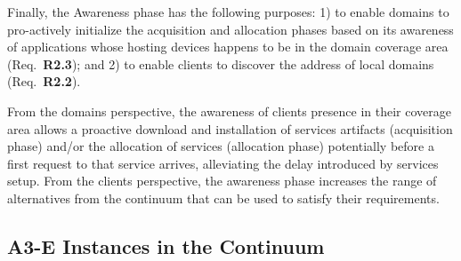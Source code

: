 
Finally, the Awareness phase has the following purposes: 1) to enable domains to pro-actively initialize the acquisition and allocation phases based on its 
awareness of applications whose hosting devices happens to be in the domain coverage area (Req.~\textbf{R2.3}); and 2) to enable clients to discover the address of local domains (Req.~\textbf{R2.2}).

From the domains perspective, the awareness of clients presence in their coverage area allows a proactive download and installation of services artifacts (acquisition phase) and/or the allocation of services (allocation phase) potentially before a first request to that service arrives, alleviating the delay introduced by services setup.  From the clients perspective, the awareness phase increases the range of alternatives from the continuum that can be used to satisfy their requirements.





\subsection{A3-E Instances in the Continuum}

